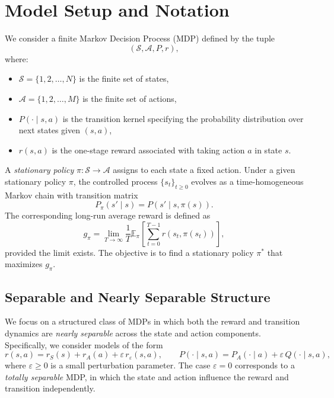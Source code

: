 \documentclass{article}
\begin{document}
\section{Model Setup and Notation}

We consider a finite Markov Decision Process (MDP) defined by the tuple
\[
(\mathcal{S}, \mathcal{A}, P, r),
\]
where:
\begin{itemize}
    \item $\mathcal{S} = \{1, 2, \ldots, N\}$ is the finite set of states,
    \item $\mathcal{A} = \{1, 2, \ldots, M\}$ is the finite set of actions,
    \item $P(\cdot \mid s,a)$ is the transition kernel specifying the probability distribution over next states given $(s,a)$,
    \item $r(s,a)$ is the one-stage reward associated with taking action $a$ in state $s$.
\end{itemize}

A \emph{stationary policy} $\pi : \mathcal{S} \to \mathcal{A}$ assigns to each state a fixed action.  
Under a given stationary policy $\pi$, the controlled process $\{s_t\}_{t \ge 0}$ evolves as a time-homogeneous Markov chain with transition matrix
\[
P_\pi(s' \mid s) = P(s' \mid s, \pi(s)).
\]
The corresponding long-run average reward is defined as
\begin{equation}
    g_\pi = \lim_{T \to \infty} \frac{1}{T} \mathbb{E}_\pi \left[ \sum_{t=0}^{T-1} r(s_t, \pi(s_t)) \right],
\end{equation}
provided the limit exists. The objective is to find a stationary policy $\pi^*$ that maximizes $g_\pi$.

\subsection{Separable and Nearly Separable Structure}

We focus on a structured class of MDPs in which both the reward and transition dynamics are \emph{nearly separable} across the state and action components.  
Specifically, we consider models of the form
\begin{equation}
    r(s,a) = r_S(s) + r_A(a) + \varepsilon\,r_\varepsilon(s,a), 
    \qquad 
    P(\cdot \mid s,a) = P_A(\cdot \mid a) + \varepsilon\,Q(\cdot \mid s,a),
    \label{eq:separable}
\end{equation}
where $\varepsilon \ge 0$ is a small perturbation parameter.  
The case $\varepsilon = 0$ corresponds to a \emph{totally separable} MDP, in which the state and action influence the reward and transition independently.
\end{document}
